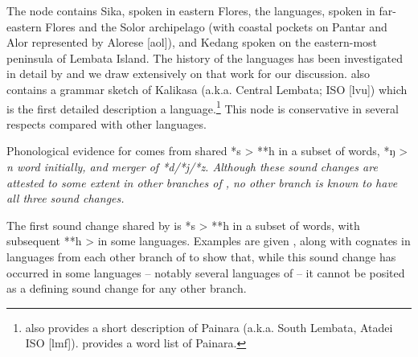 \clearpage
{}
The  node contains Sika,
spoken in eastern Flores,
the  languages, spoken in far-eastern Flores
and the Solor archipelago (with coastal pockets on Pantar
and Alor represented by Alorese [aol]),
and Kedang spoken on the eastern-most peninsula of Lembata Island.
The history of the  languages has been investigated
in detail by \citet{Fricke2019}
and we draw extensively on that work for our discussion.
\citet{Fricke2019} also contains a grammar sketch of Kalikasa (a.k.a.
Central Lembata; ISO [lvu]) which is the first detailed
description a  language.\footnote{ 
		\citet{Krauße2016} also provides a short description of  Painara (a.k.a.
		South Lembata, Atadei ISO [lmf]).
		\citet{Fricke2015b} provides a word list of Painara.}
This node is conservative in several respects compared with other
 languages.

Phonological evidence for  comes from shared
*s > **h in a subset of words,
*ŋ > \it{n} word initially,
and merger of *d/*j/*z.
Although these sound changes are attested to some extent in other
branches of , no other branch is known to have all three sound changes.

The first sound change shared by  is *s >
**h in a subset of words,
with subsequent **h > {\0} in some languages.
Examples are given ,
along with cognates in languages from each other branch of
 to show that,
while this sound change has occurred in some languages -- notably
several languages of  -- it cannot be posited
as a defining sound change for any other branch.

